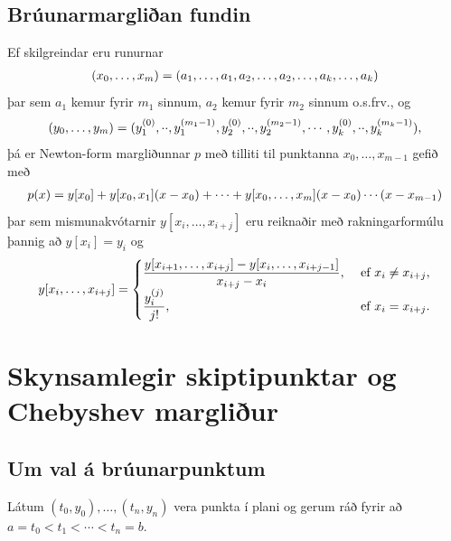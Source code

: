 \documentclass[A4paper,10pt,icelandic]{sphinxmanual}
\begin{document}
\subsection{Brúunarmargliðan fundin}
\label{kafli03:bruunarmarglian-fundin}
Ef skilgreindar eru runurnar
\begin{gather}
\begin{split}(x_0,\dots,x_m)=(a_1,\dots,a_1,a_2,\dots,a_2,\dots,a_k,\dots,a_k)\end{split}\notag
\end{gather}
þar sem \(a_1\) kemur fyrir \(m_1\) sinnum, \(a_2\) kemur
fyrir \(m_2\) sinnum o.s.frv., og
\begin{gather}
\begin{split}(y_0,\dots,y_m)=(y_1^{(0)},\cdot\cdot,y_1^{(m_1-1)},y_2^{(0)},\cdot\cdot,y_2^{(m_2-1)},
\cdots,y_k^{(0)},\cdot\cdot,y_k^{(m_k-1)}),\end{split}\notag
\end{gather}
þá er Newton-form margliðunnar \(p\) með tilliti til punktanna
\(x_0,\dots,x_{m-1}\) gefið með
\begin{gather}
\begin{split}p(x)=y[x_0]+y[x_0,x_1](x-x_0)+\cdots+y[x_0,\dots,x_m](x-x_0)\cdots(x-x_{m-1})\end{split}\notag
\end{gather}
þar sem mismunakvótarnir \(y[x_i,\ldots,x_{i+j}]\) eru reiknaðir með
rakningarformúlu þannig að \(y[x_i]=y_i\) og
\begin{gather}
\begin{split}y[x_i,\ldots,x_{i+j}]
  = \begin{cases}\dfrac{y[x_{i+1},\ldots,x_{i+j}] - y[x_i,\ldots,x_{i+j-1}]}
  {x_{i+j} - x_i}, &\text{ ef } x_i\neq x_{i+j},\\
\dfrac{y^{(j)}_i}{j!}, &\text{ ef } x_i=x_{i+j}.
\end{cases}\end{split}\notag
\end{gather}

\section{Skynsamlegir skiptipunktar og Chebyshev margliður}
\label{kafli03:skynsamlegir-skiptipunktar-og-chebyshev-margliur}

\subsection{Um val á brúunarpunktum}
\label{kafli03:um-val-a-bruunarpunktum}
Látum \((t_0,y_0),\dots,(t_n,y_n)\) vera punkta í plani og gerum ráð
fyrir að \(a=t_0<t_1<\cdots<t_n=b\).
\end{document}
